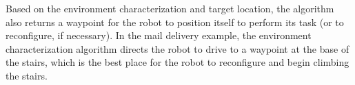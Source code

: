 \documentclass[journal]{IEEEtran}
\begin{document}

Based on the environment characterization and target location, the algorithm also returns a waypoint for the robot to position itself to perform its task (or to reconfigure, if necessary).  In the mail delivery example, the environment characterization algorithm directs the robot to drive to a waypoint at the base of the stairs, which is the best place for the robot to reconfigure and begin climbing the stairs.
\end{document}
